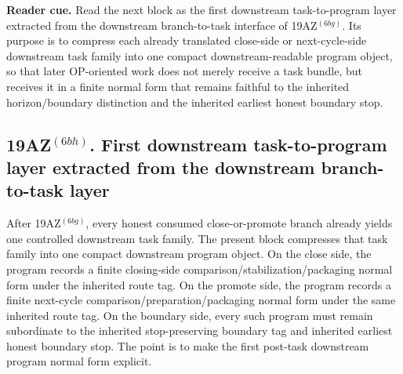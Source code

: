 \noindent\textbf{Reader cue.} Read the next block as the first downstream task-to-program layer extracted from the downstream branch-to-task interface of 19AZ$^{(6bg)}$. Its purpose is to compress each already translated close-side or next-cycle-side downstream task family into one compact downstream-readable program object, so that later OP-oriented work does not merely receive a task bundle, but receives it in a finite normal form that remains faithful to the inherited horizon/boundary distinction and the inherited earliest honest boundary stop.

\subsection*{19AZ$^{(6bh)}$. First downstream task-to-program layer extracted from the downstream branch-to-task layer}
\label{sec:first-downstream-task-to-program-layer-extracted-from-the-downstream-branch-to-task-layer}
After 19AZ$^{(6bg)}$, every honest consumed close-or-promote branch already yields one controlled downstream task family. The present block compresses that task family into one compact downstream program object. On the close side, the program records a finite closing-side comparison/stabilization/packaging normal form under the inherited route tag. On the promote side, the program records a finite next-cycle comparison/preparation/packaging normal form under the same inherited route tag. On the boundary side, every such program must remain subordinate to the inherited stop-preserving boundary tag and inherited earliest honest boundary stop. The point is to make the first post-task downstream program normal form explicit.

